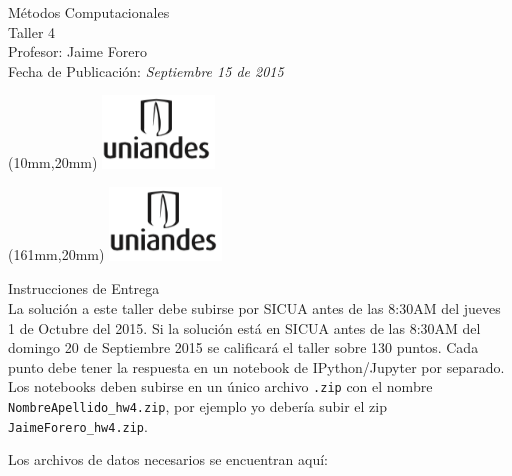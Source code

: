 \documentclass[11pt,letterpaper]{exam}
\begin{document}
\begin{center}
{\Large Métodos Computacionales} \\
Taller 4 \\
Profesor: Jaime Forero\\
Fecha de Publicación: {\small \it Septiembre 15 de 2015}\\
\end{center}

\begin{textblock*}{40mm}(10mm,20mm)
  \includegraphics[width=3cm]{logoUniandes.png}
\end{textblock*}

\begin{textblock*}{40mm}(161mm,20mm)
  \includegraphics[width=3cm]{logoUniandes.png}
\end{textblock*}

\vspace{0.5cm}

{\Large Instrucciones de Entrega}\\

\noindent
La solución a este taller debe subirse por SICUA antes de las 8:30AM
del jueves 1 de Octubre del 2015. 
\noindent
Si la soluci\'on est\'a en SICUA
antes de las 8:30AM del domingo 20 de Septiembre 2015 se calificar\'a
el taller sobre 130 puntos. 
\noindent
Cada punto debe tener la respuesta en un notebook de IPython/Jupyter por
separado. Los notebooks deben subirse en un \'unico archivo
\verb".zip" con el nombre \verb"NombreApellido_hw4.zip", por ejemplo
yo deber\'ia subir el zip \verb"JaimeForero_hw4.zip".

\noindent
Los archivos de datos necesarios se encuentran aqu\'i:
\end{document}
